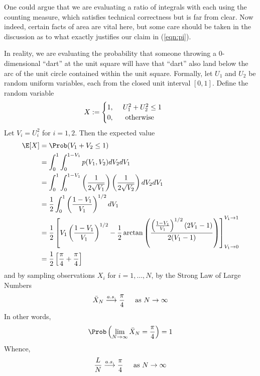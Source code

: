 One could argue that we are evaluating a ratio of integrals with each using
the counting measure, which satisfies technical correctness but is far from
clear. Now indeed, certain facts of area are vital here, but some care should
be taken in the discussion as to what exactly justifies our claim in
(\ref{eqn:pi}).

In reality, we are evaluating the probability that someone throwing a
0-dimensional ``dart'' at the unit square will have that ``dart'' also
land below the arc of the unit circle contained within the unit square.
Formally, let $U_1$ and $U_2$ be random uniform variables, each from the
closed unit interval $[0, 1]$.  Define the random variable
\begin{align*}
X &:= 
\begin{cases} 
1\text{, } \hspace{.4cm} U_1^2 + U_2^2 \leq 1\\ 
0\text{, \hspace{.4cm} otherwise}
\end{cases}
\end{align*}
Let $V_i = U_i^2$ for $i=1, 2$. Then the expected value
\begin{align*}
\E[X] &= \Prob( V_1 + V_2 \leq 1 )\\
     &= \int_0^1 \int_0^{1-V_1} p(V_1, V_2)dV_2 dV_1\\
     &= \int_0^1 \int_0^{1-V_1} \left( \frac{1}{2\sqrt{V_1}} \right)
        \left( \frac{1}{2\sqrt{V_2}} \right)dV_2 dV_1\\
     &= \frac{1}{2}\int_0^1 \left(\frac{1-V_1}{V_1}\right)^{1/2}dV_1\\
     &= \frac{1}{2} \left[ 
	V_1\left(\frac{1-V_1}{V_1}\right)^{1/2} 
	 - \frac{1}{2} \arctan\left(\frac{\left(\frac{1-V_1}{V_1}\right)^{1/2}
        (2V_1-1)}{2(V_1-1)}\right) 
	\right]_{V_1\rightarrow 0}^{V_1\rightarrow 1}\\
     &= \frac{1}{2}\left[ \frac{\pi}{4} +\frac{\pi}{4}  \right]
\end{align*}
and by sampling observations $X_i$ for $i=1,\dots,N$, by the Strong Law of
Large Numbers~
\begin{equation}
\bar{X}_N \stackrel{a.s.}{\longrightarrow} \frac{\pi}{4}
\hspace{.4cm} \text{ as } N\rightarrow \infty
\index{Convergence!a.s.}
\label{eqn:as_convergence}
\end{equation}
In other words,
\begin{align*}
\Prob\left(\lim_{N\rightarrow\infty} \bar{X}_N = \frac{\pi}{4}\right) = 1
\end{align*}
Whence,
\begin{align*}
\frac{L}{N} \stackrel{a.s.}{\longrightarrow} \frac{\pi}{4} \hspace{.4cm}
\text{ as } N\rightarrow \infty
\end{align*}

